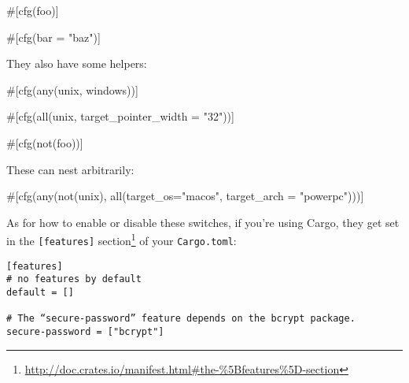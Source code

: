 \documentclass[a4paper,]{book}
\newenvironment{Shaded}{\begin{snugshade}}{\end{snugshade}}
\newcommand{\StringTok}[1]{\textcolor[rgb]{0.31,0.60,0.02}{{#1}}}
\newcommand{\AttributeTok}[1]{\textcolor[rgb]{0.77,0.63,0.00}{{#1}}}
\newcommand{\NormalTok}[1]{{#1}}
\renewcommand{\href}[2]{#2\footnote{\url{#1}}}
\begin{document}
\begin{Shaded}
\begin{Highlighting}[]
\AttributeTok{#[}\NormalTok{cfg}\AttributeTok{(}\NormalTok{foo}\AttributeTok{)]}

\AttributeTok{#[}\NormalTok{cfg}\AttributeTok{(}\NormalTok{bar }\AttributeTok{=} \StringTok{"baz"}\AttributeTok{)]}
\end{Highlighting}
\end{Shaded}

They also have some helpers:

\begin{Shaded}
\begin{Highlighting}[]
\AttributeTok{#[}\NormalTok{cfg}\AttributeTok{(}\NormalTok{any}\AttributeTok{(}\NormalTok{unix}\AttributeTok{,} \NormalTok{windows}\AttributeTok{))]}

\AttributeTok{#[}\NormalTok{cfg}\AttributeTok{(}\NormalTok{all}\AttributeTok{(}\NormalTok{unix}\AttributeTok{,} \NormalTok{target_pointer_width }\AttributeTok{=} \StringTok{"32"}\AttributeTok{))]}

\AttributeTok{#[}\NormalTok{cfg}\AttributeTok{(}\NormalTok{not}\AttributeTok{(}\NormalTok{foo}\AttributeTok{))]}
\end{Highlighting}
\end{Shaded}

These can nest arbitrarily:

\begin{Shaded}
\begin{Highlighting}[]
\AttributeTok{#[}\NormalTok{cfg}\AttributeTok{(}\NormalTok{any}\AttributeTok{(}\NormalTok{not}\AttributeTok{(}\NormalTok{unix}\AttributeTok{),} \NormalTok{all}\AttributeTok{(}\NormalTok{target_os}\AttributeTok{=}\StringTok{"macos"}\AttributeTok{,} \NormalTok{target_arch }\AttributeTok{=} \StringTok{"powerpc"}\AttributeTok{)))]}
\end{Highlighting}
\end{Shaded}

As for how to enable or disable these switches, if you're using Cargo,
they get set in the
\href{http://doc.crates.io/manifest.html\#the-\%5Bfeatures\%5D-section}{\texttt{{[}features{]}}
section} of your \texttt{Cargo.toml}:

\begin{verbatim}
[features]
# no features by default
default = []

# The “secure-password” feature depends on the bcrypt package.
secure-password = ["bcrypt"]
\end{verbatim}
\end{document}
